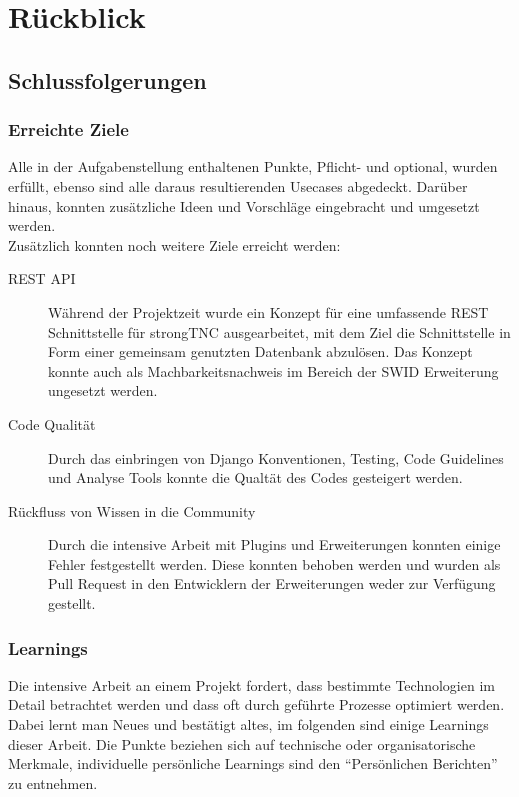 \chapter{Rückblick}


\section{Schlussfolgerungen}

\subsection{Erreichte Ziele}
Alle in der Aufgabenstellung enthaltenen Punkte, Pflicht- und optional,  wurden
erfüllt, ebenso sind alle daraus resultierenden Usecases abgedeckt. Darüber
hinaus, konnten zusätzliche Ideen und Vorschläge eingebracht und umgesetzt
werden.\\
Zusätzlich konnten noch weitere Ziele erreicht werden:                 
\begin{description}                  
                                  
	\item[REST API] Während der Projektzeit wurde ein Konzept für eine umfassende
	REST Schnittstelle für strongTNC ausgearbeitet, mit dem Ziel die Schnittstelle
	in Form einer gemeinsam genutzten Datenbank abzulösen. Das Konzept konnte auch
	als Machbarkeitsnachweis im Bereich der SWID Erweiterung ungesetzt werden.
	
	\item[Code Qualität] Durch das einbringen von Django Konventionen, Testing,
	Code Guidelines und Analyse Tools konnte die Qualtät des Codes gesteigert
	werden.
	
	\item[Rückfluss von Wissen in die Community] Durch die intensive Arbeit mit
	Plugins und Erweiterungen konnten einige Fehler festgestellt werden. Diese
	konnten behoben werden und wurden als Pull Request in den Entwicklern der
	Erweiterungen weder zur Verfügung gestellt.
	
\end{description}


\subsection{Learnings}
Die intensive Arbeit an einem Projekt fordert, dass bestimmte Technologien im
Detail betrachtet werden und dass oft durch geführte Prozesse optimiert werden.
Dabei lernt man Neues und bestätigt altes, im folgenden sind einige Learnings
dieser Arbeit. Die Punkte beziehen sich auf technische oder organisatorische
Merkmale, individuelle persönliche Learnings sind den \enquote{Persönlichen
Berichten} zu entnehmen.

